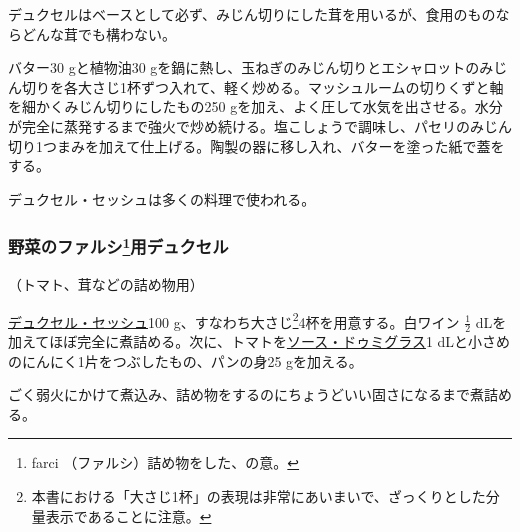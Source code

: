 \begin{recette}

デュクセルはベースとして必ず、みじん切りにした茸を用いるが、食用のものならどんな茸でも構わない。

バター30 gと植物油30
gを鍋に熱し、玉ねぎのみじん切りとエシャロットのみじん切りを各大さじ1杯ずつ入れて、軽く炒める。マッシュルームの切りくずと軸を細かくみじん切りにしたもの250
gを加え、よく圧して水気を出させる。水分が完全に蒸発するまで強火で炒め続ける。塩こしょうで調味し、パセリのみじん切り1つまみを加えて仕上げる。陶製の器に移し入れ、バターを塗った紙で蓋をする。

デュクセル・セッシュは多くの料理で使われる。

\atoaki{}

\hypertarget{duxelles-pour-legumes-farcis}{%
\subsubsection[野菜のファルシ用デュクセル]{\texorpdfstring{野菜のファルシ\footnote{farci
  （ファルシ）詰め物をした、の意。}用デュクセル}{野菜のファルシ用デュクセル}}\label{duxelles-pour-legumes-farcis}}



（トマト、茸などの詰め物用）

\protect\hyperlink{duxelles-seche}{デュクセル・セッシュ}100
g、すなわち大さじ\footnote{本書における「大さじ1杯」の表現は非常にあいまいで、ざっくりとした分量表示であることに注意。}4杯を用意する。白ワイン
\(\frac{1}{2}\)
dLを加えてほぼ完全に煮詰める。次に、トマトを\protect\hyperlink{sauce-demi-glace}{ソース・ドゥミグラス}1
dLと小さめのにんにく1片をつぶしたもの、パンの身25 gを加える。

ごく弱火にかけて煮込み、詰め物をするのにちょうどいい固さになるまで煮詰める。


\end{recette}

